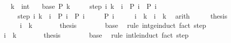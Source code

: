 \begin{isabellebody}
\ \ \ k\ {\isacharcolon}{\kern0pt}{\isacharcolon}{\kern0pt}\ int\isanewline
\ \ \ base{\isacharcolon}{\kern0pt}\ {\isachardoublequoteopen}P\ k{\isachardoublequoteclose}\isanewline
\ \ \ \ \ step{}{\isacharcolon}{\kern0pt}\ {\isachardoublequoteopen}{\isasymAnd}i{\isachardot}{\kern0pt}\ k\ {\isasymle}\ i\ {\isasymLongrightarrow}\ P\ i\ {\isasymLongrightarrow}\ P\ {\isacharparenleft}{\kern0pt}i\ {\isacharplus}{\kern0pt}\ {}{\isacharparenright}{\kern0pt}{\isachardoublequoteclose}\isanewline
\ \ \ \ \ step{}{\isacharcolon}{\kern0pt}\ {\isachardoublequoteopen}{\isasymAnd}i{\isachardot}{\kern0pt}\ k\ {\isasymge}\ i\ {\isasymLongrightarrow}\ P\ i\ {\isasymLongrightarrow}\ P\ {\isacharparenleft}{\kern0pt}i\ {\isacharminus}{\kern0pt}\ {}{\isacharparenright}{\kern0pt}{\isachardoublequoteclose}\isanewline
\ \ \ {\isachardoublequoteopen}P\ i{\isachardoublequoteclose}\isanewline
%
\isadelimproof
%
\endisadelimproof
%
\isatagproof
{}\isamarkupfalse%
\ {\isacharminus}{\kern0pt}\isanewline
\ \ \isamarkupfalse%
\ {\isachardoublequoteopen}i\ {\isasymle}\ k\ {\isasymor}\ i\ {\isasymge}\ k{\isachardoublequoteclose}\ \isamarkupfalse%
\ arith\isanewline
\ \ \isamarkupfalse%
\ \isamarkupfalse%
\ {\isacharquery}{\kern0pt}thesis\isanewline
\ \ \isamarkupfalse%
\isanewline
\ \ \ \ \isamarkupfalse%
\ {\isachardoublequoteopen}i\ {\isasymge}\ k{\isachardoublequoteclose}\isanewline
\ \ \ \ \isamarkupfalse%
\ \isamarkupfalse%
\ {\isacharquery}{\kern0pt}thesis\isanewline
\ \ \ \ \ \ \isamarkupfalse%
\ base\ \isamarkupfalse%
\ {\isacharparenleft}{\kern0pt}rule\ int{\isacharunderscore}{\kern0pt}ge{\isacharunderscore}{\kern0pt}induct{\isacharparenright}{\kern0pt}\ {\isacharparenleft}{\kern0pt}fact\ step{}{\isacharparenright}{\kern0pt}\isanewline
\ \ \isamarkupfalse%
\isanewline
\ \ \ \ \isamarkupfalse%
\ {\isachardoublequoteopen}i\ {\isasymle}\ k{\isachardoublequoteclose}\isanewline
\ \ \ \ \isamarkupfalse%
\ \isamarkupfalse%
\ {\isacharquery}{\kern0pt}thesis\isanewline
\ \ \ \ \ \ \isamarkupfalse%
\ base\ \isamarkupfalse%
\ {\isacharparenleft}{\kern0pt}rule\ int{\isacharunderscore}{\kern0pt}le{\isacharunderscore}{\kern0pt}induct{\isacharparenright}{\kern0pt}\ {\isacharparenleft}{\kern0pt}fact\ step{}{\isacharparenright}{\kern0pt}\isanewline

\end{isabellebody}
